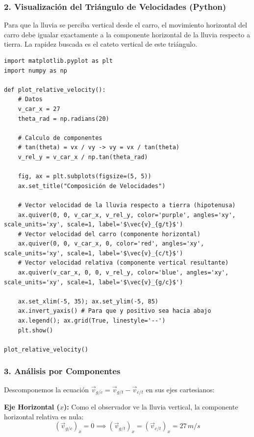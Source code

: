 \documentclass[12pt, a4paper]{article}
\begin{document}
\subsubsection*{2. Visualización del Triángulo de Velocidades (Python)}

Para que la lluvia se perciba vertical desde el carro, el movimiento horizontal del carro debe igualar exactamente a la componente horizontal de la lluvia respecto a tierra. La rapidez buscada es el cateto vertical de este triángulo.



\begin{lstlisting}
import matplotlib.pyplot as plt
import numpy as np

def plot_relative_velocity():
    # Datos
    v_car_x = 27
    theta_rad = np.radians(20)
    
    # Calculo de componentes
    # tan(theta) = vx / vy -> vy = vx / tan(theta)
    v_rel_y = v_car_x / np.tan(theta_rad)
    
    fig, ax = plt.subplots(figsize=(5, 5))
    ax.set_title("Composición de Velocidades")
    
    # Vector velocidad de la lluvia respecto a tierra (hipotenusa)
    ax.quiver(0, 0, v_car_x, v_rel_y, color='purple', angles='xy', scale_units='xy', scale=1, label='$\vec{v}_{g/t}$')
    # Vector velocidad del carro (componente horizontal)
    ax.quiver(0, 0, v_car_x, 0, color='red', angles='xy', scale_units='xy', scale=1, label='$\vec{v}_{c/t}$')
    # Vector velocidad relativa (componente vertical resultante)
    ax.quiver(v_car_x, 0, 0, v_rel_y, color='blue', angles='xy', scale_units='xy', scale=1, label='$\vec{v}_{g/c}$')

    ax.set_xlim(-5, 35); ax.set_ylim(-5, 85)
    ax.invert_yaxis() # Para que y positivo sea hacia abajo
    ax.legend(); ax.grid(True, linestyle='--')
    plt.show()

plot_relative_velocity()
\end{lstlisting}

\subsubsection*{3. Análisis por Componentes}

Descomponemos la ecuación $\vec{v}_{g/c} = \vec{v}_{g/t} - \vec{v}_{c/t}$ en sus ejes cartesianos:

\textbf{Eje Horizontal ($x$):}
Como el observador ve la lluvia vertical, la componente horizontal relativa es nula:
\begin{equation}
    (\vec{v}_{g/c})_x = 0 \implies (\vec{v}_{g/t})_x = (\vec{v}_{c/t})_x = 27 \, \si{m/s}
\end{equation}
\end{document}
